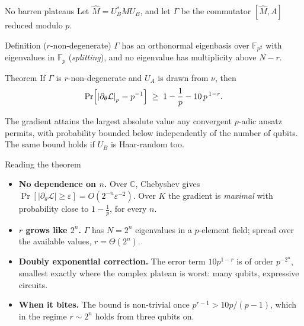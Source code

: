 \documentclass[aspectratio=169,compress]{beamer}
\newcommand{\FF}{\mathbb{F}}
\newcommand{\loss}{\mathcal{L}}
\newcommand{\padicnorm}[1]{\left|#1\right|_p}
\begin{document}
\begin{frame}{No barren plateaus}
  Let $\widehat M=U_B^{*}MU_B$, and let $\Gamma$ be the commutator
  $[\widehat M,A]$ reduced modulo $p$.
  \begin{block}{Definition ($r$-non-degenerate)}
    $\Gamma$ has an orthonormal eigenbasis over $\FF_{p^2}$ with eigenvalues in
    $\FF_p$ (\emph{splitting}), and no eigenvalue has multiplicity above $N-r$.
  \end{block}
  \begin{alertblock}{Theorem}
    If $\Gamma$ is $r$-non-degenerate and $U_A$ is drawn from $\nu$, then
    \[
      \Pr\Bigl[\padicnorm{\partial_\theta\loss}=p^{-1}\Bigr]
      \;\ge\;1-\frac1p-10\,p^{\,1-r}.
    \]
  \end{alertblock}
  The gradient attains the largest absolute value any convergent $p$-adic
  ansatz permits, with probability bounded below \alert{independently of the
  number of qubits}. The same bound holds if $U_B$ is Haar-random too.
\end{frame}

\begin{frame}{Reading the theorem}
  \begin{itemize}
    \item \textbf{No dependence on $n$.} Over $\mathbb{C}$, Chebyshev gives
      $\Pr[|\partial_\theta\loss|\ge\varepsilon]=O(2^{-n}\varepsilon^{-2})$.
      Over $K$ the gradient is \emph{maximal} with probability close to
      $1-\frac1p$, for every $n$.
    \item \textbf{$r$ grows like $2^{n}$.} $\Gamma$ has $N=2^{n}$ eigenvalues
      in a $p$-element field; spread over the available values,
      $r=\Theta(2^{n})$.
    \item \textbf{Doubly exponential correction.} The error term $10p^{1-r}$ is
      of order $p^{-2^{n}}$, smallest exactly where the complex plateau is
      worst: many qubits, expressive circuits.
    \item \textbf{When it bites.} The bound is non-trivial once
      $p^{r-1}>10p/(p-1)$, which in the regime $r\sim2^{n}$ holds from three
      qubits on.
  \end{itemize}
\end{frame}
\end{document}
